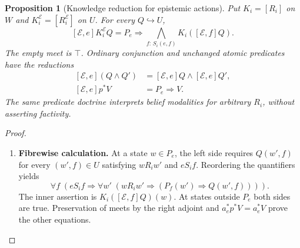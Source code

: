 \documentclass[11pt,a4paper]{article}
\numberwithin{equation}{section}
\newtheorem{proposition}[theorem]{Proposition}
\theoremstyle{definition}
\theoremstyle{remark}
\theoremstyle{plain}
\begin{document}
\begin{proposition}[Knowledge reduction for epistemic actions]
\label{prop:egt-action-knowledge-reduction}
Put $K_i=[R_i]$ on $W$ and $K_i^{\mathcal E}=[R_i^{\mathcal E}]$
on $U$. For every $Q\hookrightarrow U$,
\begin{equation}\label{eq:egt-action-knowledge-reduction}
 [\mathcal E,e]K_i^{\mathcal E}Q
 =P_e\Rightarrow
   \bigwedge_{f:\,S_i(e,f)}K_i([\mathcal E,f]Q).
\end{equation}
The empty meet is $\top$. Ordinary conjunction and unchanged atomic
predicates have the reductions
\[
 \begin{aligned}
 [\mathcal E,e](Q\wedge Q')
   &=[\mathcal E,e]Q\wedge[\mathcal E,e]Q',\\
 [\mathcal E,e]p^*V&=P_e\Rightarrow V.
 \end{aligned}
\]
The same predicate doctrine interprets belief modalities for arbitrary
$R_i$, without asserting factivity.
\end{proposition}
\begin{proof}
\leavevmode
\begin{enumerate}[label=\textup{(\arabic*)},leftmargin=*,itemsep=4pt,topsep=3pt]
  \item \textbf{Fibrewise calculation.} At a state $w\in P_e$, the left side requires $Q(w',f)$ for every
$(w',f)\in U$ satisfying $wR_iw'$ and $eS_if$. Reordering the
quantifiers yields
\[
 \forall f\;(eS_if\Rightarrow
   \forall w'\;(wR_iw'\Rightarrow(P_f(w')\Rightarrow Q(w',f)))).
\]
The inner assertion is $K_i([\mathcal E,f]Q)(w)$. At states outside
$P_e$ both sides are true. Preservation of meets by the right adjoint
and $a_e^*p^*V=a_e^*V$ prove the other equations.
\end{enumerate}
\end{proof}
\end{document}
